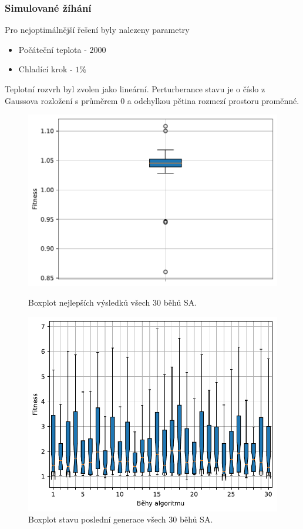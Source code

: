 \subsubsection{Simulované žíhání}
Pro nejoptimálnější řešení byly nalezeny parametry 
\begin{itemize}
    \item Počáteční teplota - $2000$
    \item Chladící krok - $1\%$
\end{itemize}
Teplotní rozvrh byl zvolen jako lineární. Perturberance stavu je o číslo z Gaussova rozložení s průměrem 0 a odchylkou pětina rozmezí prostoru proměnné.

\begin{figure}[H]
\begin{minipage}[t]{0.475\linewidth}
\includegraphics[width=\linewidth]{obrazky-figures/statistics/Benchmarks/Griewank/SA/bestsBoxplot_WithOutliers.pdf}
\caption{Boxplot nejlepších výsledků všech $30$ běhů SA.}
\label{fg:bench:griewank:sa:best}
\end{minipage}
\hfill
\begin{minipage}[t]{0.475\linewidth}
\includegraphics[width=\linewidth]{obrazky-figures/statistics/Benchmarks/Griewank/SA/lastGenBoxplots.pdf}
\caption{Boxplot stavu poslední generace všech $30$ běhů SA.}
\label{fg:bench:griewank:sa:lastGen}
\end{minipage}
\end{figure}

